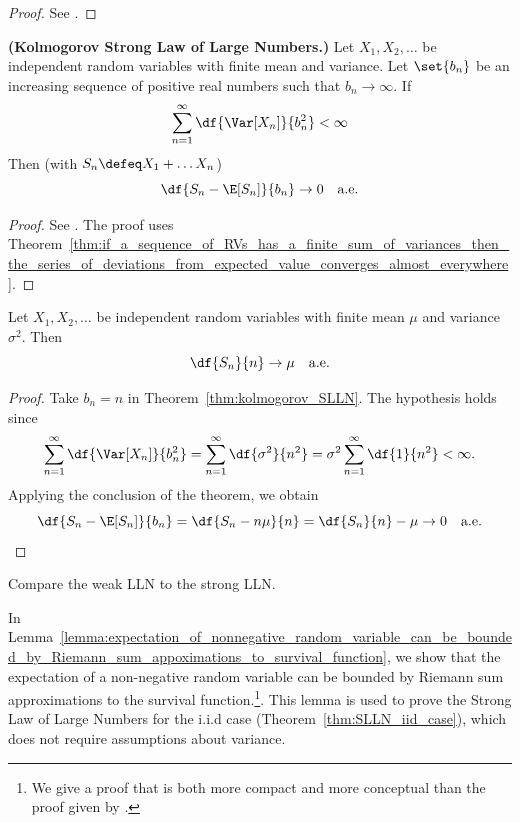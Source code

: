 \documentclass{article} %
\begin{document}
\begin{proof}
See \cite[Thm.~6.2.1]{ash2000probability}.	
\end{proof}

\begin{theorem}
\textbf{(Kolmogorov Strong Law of Large Numbers.)} Let $X_1, X_2, \hdots$ be independent random variables with finite mean and variance.  Let $\set{b_n}$ be an increasing sequence of positive real numbers such that $b_n \to \infty$.  
If
\[  \sum_{n=1}^\infty \df{\Var[X_n]}{b_n^2} < \infty\]
Then (with $S_n \defeq X_1 + \hdots X_n$)
\[\df{S_n - \E[S_n]}{b_n} \to 0 \quad \text{a.e.} \] 	
\label{thm:kolmogorov_SLLN}
\end{theorem}

\begin{proof}
See \cite[Thm.~6.2.2]{ash2000probability}. The proof uses Theorem~\ref{thm:if_a_sequence_of_RVs_has_a_finite_sum_of_variances_then_the_series_of_deviations_from_expected_value_converges_almost_everywhere}.
\end{proof}

\begin{example}
Let $X_1, X_2, \hdots$ be independent random variables with finite mean $\mu$ and variance $\sigma^2$.  Then 
\[ \df{S_n}{n} \to \mu \quad \text{a.e.} \] 
\label{example:independent_rvs_with_finite_mean_and_variance_have_sample_means_which_converge_to_the_population_mean}
\end{example}

\begin{proof}
Take $b_n = n$ in Theorem~\ref{thm:kolmogorov_SLLN}.  The hypothesis holds since
%
\[\sum_{n=1}^\infty \df{\Var[X_n]}{b_n^2} = \sum_{n=1}^\infty \df{\sigma^2}{n^2} = \sigma^2 \sum_{n=1}^\infty \df{1}{n^2} < \infty.\] 
Applying the conclusion of the theorem, we obtain
\[\df{S_n - \E[S_n]}{b_n}  = \df{S_n - n \mu}{n} = \df{S_n}{n} - \mu \to 0 \quad \text{a.e.} \]
\end{proof}

\begin{task}
Compare the weak LLN to the strong LLN.	
\end{task}



In Lemma~\ref{lemma:expectation_of_nonnegative_random_variable_can_be_bounded_by_Riemann_sum_appoximations_to_survival_function}, we show that the expectation of a non-negative random variable can be bounded by Riemann sum approximations to the survival function.\footnote{We give a proof that is both more compact and more conceptual than the proof given by \cite[Lemma~6.2.4]{ash2000probability}.}. This lemma is used to prove the Strong Law of Large Numbers for the i.i.d case (Theorem~\ref{thm:SLLN_iid_case}), which does not require assumptions about variance.
\end{document}
